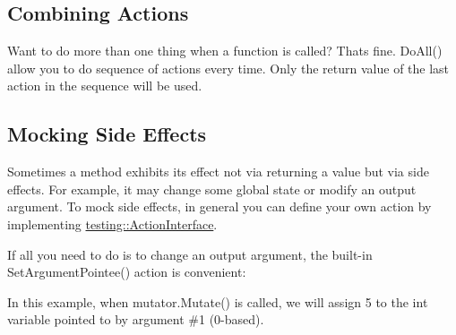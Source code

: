 \subsection*{Combining Actions}

Want to do more than one thing when a function is called? That\textquotesingle{}s fine. {\ttfamily Do\+All()} allow you to do sequence of actions every time. Only the return value of the last action in the sequence will be used.


\begin{DoxyCode}{0}
\DoxyCodeLine{}
\DoxyCodeLine{\};}
\DoxyCodeLine{}
\end{DoxyCode}


\subsection*{Mocking Side Effects}

Sometimes a method exhibits its effect not via returning a value but via side effects. For example, it may change some global state or modify an output argument. To mock side effects, in general you can define your own action by implementing {\ttfamily \mbox{\hyperlink{classtesting_1_1_action_interface}{testing\+::\+Action\+Interface}}}.

If all you need to do is to change an output argument, the built-\/in {\ttfamily Set\+Argument\+Pointee()} action is convenient\+:


\begin{DoxyCode}{0}
\DoxyCodeLine{}
\DoxyCodeLine{\};}
\DoxyCodeLine{}
\end{DoxyCode}


In this example, when {\ttfamily mutator.\+Mutate()} is called, we will assign 5 to the {\ttfamily int} variable pointed to by argument \#1 (0-\/based).

